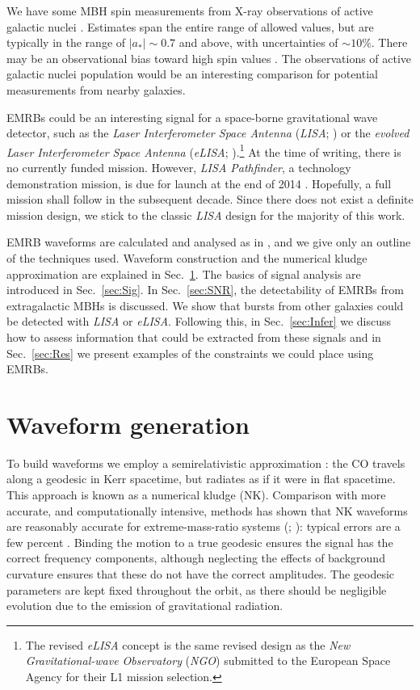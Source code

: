 \documentclass[useAMS,usedcolumn,usegraphicx,usenatbib]{mn2e}
\newcommand{\secref}[1]{Sec.~\ref{sec:#1}}
\begin{document}
We have some MBH spin measurements from X-ray observations of active galactic nuclei \citep[e.g.,][]{Walton2013}. Estimates span the entire range of allowed values, but are typically in the range of $|a_\ast| \sim 0.7$ and above, with uncertainties of $\sim 10\%$. There may be an observational bias toward high spin values \citep{Brenneman2011}. The observations of active galactic nuclei population would be an interesting comparison for potential measurements from nearby galaxies. %

EMRBs could be an interesting signal for a space-borne gravitational wave detector, such as the \textit{Laser Interferometer Space Antenna} (\textit{LISA}; \citealt{Bender1998, Danzmann2003}) or the \textit{evolved Laser Interferometer Space Antenna} (\textit{eLISA}; \citealt{Jennrich2011, Amaro-Seoane2012a}).\footnote{The revised \textit{eLISA} concept is the same revised design as the \textit{New Gravitational-wave Observatory} (\textit{NGO}) submitted to the European Space Agency for their L1 mission selection.} At the time of writing, there is no currently funded mission. However, \textit{LISA Pathfinder}, a technology demonstration mission, is due for launch at the end of 2014 \citep{Anza2005, Antonucci2012}. Hopefully, a full mission shall follow in the subsequent decade. Since there does not exist a definite mission design, we stick to the classic \textit{LISA} design for the majority of this work.

EMRB waveforms are calculated and analysed as in \citet{Berry2013}, and we give only an outline of the techniques used. Waveform construction and the numerical kludge approximation are explained in \secref{Wave}. The basics of signal analysis are introduced in \secref{Sig}. In \secref{SNR}, the detectability of EMRBs from extragalactic MBHs is discussed. We show that bursts from other galaxies could be detected with \textit{LISA} or \textit{eLISA}. Following this, in \secref{Infer} we discuss how to assess information that could be extracted from these signals and in \secref{Res} we present examples of the constraints we could place using EMRBs.

\section{Waveform generation}\label{sec:Wave}

To build waveforms we employ a semirelativistic approximation \citep{Ruffini1981}: the CO travels along a geodesic in Kerr spacetime, but radiates as if it were in flat spacetime. This approach is known as a numerical kludge (NK). Comparison with more accurate, and computationally intensive, methods has shown that NK waveforms are reasonably accurate for extreme-mass-ratio systems (\citealt*{Gair2005}; \citealt{Babak2007}): typical errors are a few percent \citep{Tanaka1993,Gair2005,Berry2013}. Binding the motion to a true geodesic ensures the signal has the correct frequency components, although neglecting the effects of background curvature ensures that these do not have the correct amplitudes. The geodesic parameters are kept fixed throughout the orbit, as there should be negligible evolution due to the emission of gravitational radiation.
\end{document}
